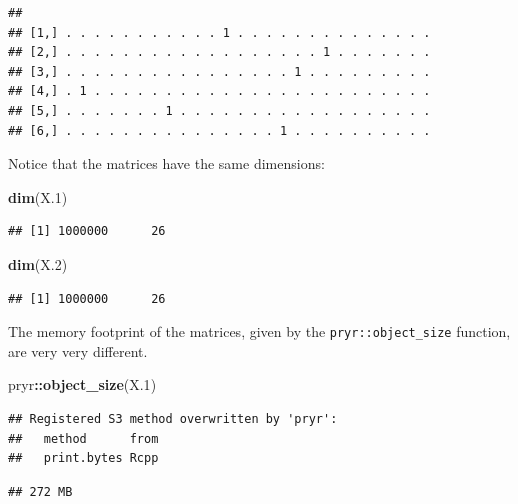 \documentclass[]{book}
\newenvironment{Shaded}{\begin{snugshade}}{\end{snugshade}}
\newcommand{\FloatTok}[1]{\textcolor[rgb]{0.00,0.00,0.81}{#1}}
\newcommand{\KeywordTok}[1]{\textcolor[rgb]{0.13,0.29,0.53}{\textbf{#1}}}
\newcommand{\NormalTok}[1]{#1}
\newcommand{\OperatorTok}[1]{\textcolor[rgb]{0.81,0.36,0.00}{\textbf{#1}}}
\theoremstyle{definition}
\theoremstyle{definition}
\theoremstyle{definition}
\theoremstyle{remark}
\begin{document}
\begin{verbatim}
##                                                         
## [1,] . . . . . . . . . . . 1 . . . . . . . . . . . . . .
## [2,] . . . . . . . . . . . . . . . . . . 1 . . . . . . .
## [3,] . . . . . . . . . . . . . . . . 1 . . . . . . . . .
## [4,] . 1 . . . . . . . . . . . . . . . . . . . . . . . .
## [5,] . . . . . . . 1 . . . . . . . . . . . . . . . . . .
## [6,] . . . . . . . . . . . . . . . 1 . . . . . . . . . .
\end{verbatim}

Notice that the matrices have the same dimensions:

\begin{Shaded}
\begin{Highlighting}[]
\KeywordTok{dim}\NormalTok{(X}\FloatTok{.1}\NormalTok{)}
\end{Highlighting}
\end{Shaded}

\begin{verbatim}
## [1] 1000000      26
\end{verbatim}

\begin{Shaded}
\begin{Highlighting}[]
\KeywordTok{dim}\NormalTok{(X}\FloatTok{.2}\NormalTok{)}
\end{Highlighting}
\end{Shaded}

\begin{verbatim}
## [1] 1000000      26
\end{verbatim}

The memory footprint of the matrices, given by the \texttt{pryr::object\_size} function, are very very different.

\begin{Shaded}
\begin{Highlighting}[]
\NormalTok{pryr}\OperatorTok{::}\KeywordTok{object_size}\NormalTok{(X}\FloatTok{.1}\NormalTok{)}
\end{Highlighting}
\end{Shaded}

\begin{verbatim}
## Registered S3 method overwritten by 'pryr':
##   method      from
##   print.bytes Rcpp
\end{verbatim}

\begin{verbatim}
## 272 MB
\end{verbatim}
\end{document}
